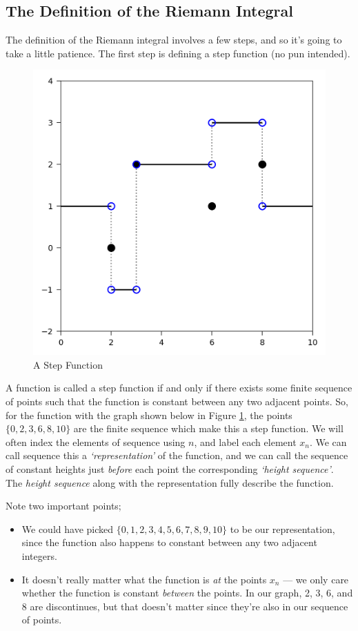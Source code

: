 \subsection{The Definition of the Riemann Integral}
The definition of the Riemann integral involves a few steps, and so it's going to take a little patience. The first step is defining a step function (no pun intended).
%
\begin{figure}[h]
	\centering
	\includegraphics{Code/Step.png}
	\caption{A Step Function}
	\label{fig:step}
\end{figure}

A function is called a step function if and only if there exists some finite sequence of points such that the function is constant between any two adjacent points. So, for the function with the graph shown below in Figure \ref{fig:step}, the points $\{0, 2, 3, 6, 8, 10\}$ are the finite sequence which make this a step function. We will often index the elements of sequence using $n$, and label each element $x_n$. We can call sequence this a \emph{`representation'} of the function, and we can call the sequence of constant heights just \emph{before} each point the corresponding \emph{`height sequence'}. The \emph{height sequence} along with the representation fully describe the function.

\medskip
Note two important points;
\begin{itemize}
	\item We could have picked $\{0, 1, 2, 3, 4, 5, 6, 7, 8, 9, 10\}$ to be our representation, since the function also happens to constant between any two adjacent integers. 
	\item It doesn't really matter what the function is {\em at} the points $x_n$ --- we only care whether the function is constant {\em between} the points. In our graph, 2, 3, 6, and 8 are discontinues, but that doesn't matter since they're also in our sequence of points. 
\end{itemize}

